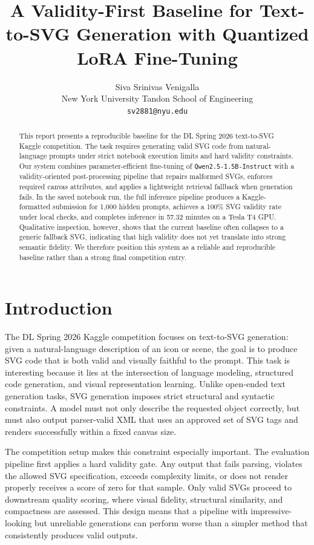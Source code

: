 \documentclass[11pt]{article}
\title{A Validity-First Baseline for Text-to-SVG Generation with Quantized LoRA Fine-Tuning}
\author{
Siva Srinivas Venigalla \\
New York University Tandon School of Engineering \\
\texttt{sv2881@nyu.edu}
}
\begin{document}
\maketitle

\begin{abstract}
This report presents a reproducible baseline for the DL Spring 2026 text-to-SVG Kaggle competition. The task requires generating valid SVG code from natural-language prompts under strict notebook execution limits and hard validity constraints. Our system combines parameter-efficient fine-tuning of \texttt{Qwen2.5-1.5B-Instruct} with a validity-oriented post-processing pipeline that repairs malformed SVGs, enforces required canvas attributes, and applies a lightweight retrieval fallback when generation fails. In the saved notebook run, the full inference pipeline produces a Kaggle-formatted submission for 1,000 hidden prompts, achieves a 100\% SVG validity rate under local checks, and completes inference in 57.32 minutes on a Tesla T4 GPU. Qualitative inspection, however, shows that the current baseline often collapses to a generic fallback SVG, indicating that high validity does not yet translate into strong semantic fidelity. We therefore position this system as a reliable and reproducible baseline rather than a strong final competition entry.
\end{abstract}

\section{Introduction}
The DL Spring 2026 Kaggle competition focuses on text-to-SVG generation: given a natural-language description of an icon or scene, the goal is to produce SVG code that is both valid and visually faithful to the prompt. This task is interesting because it lies at the intersection of language modeling, structured code generation, and visual representation learning. Unlike open-ended text generation tasks, SVG generation imposes strict structural and syntactic constraints. A model must not only describe the requested object correctly, but must also output parser-valid XML that uses an approved set of SVG tags and renders successfully within a fixed canvas size.

The competition setup makes this constraint especially important. The evaluation pipeline first applies a hard validity gate. Any output that fails parsing, violates the allowed SVG specification, exceeds complexity limits, or does not render properly receives a score of zero for that sample. Only valid SVGs proceed to downstream quality scoring, where visual fidelity, structural similarity, and compactness are assessed. This design means that a pipeline with impressive-looking but unreliable generations can perform worse than a simpler method that consistently produces valid outputs.
\end{document}
